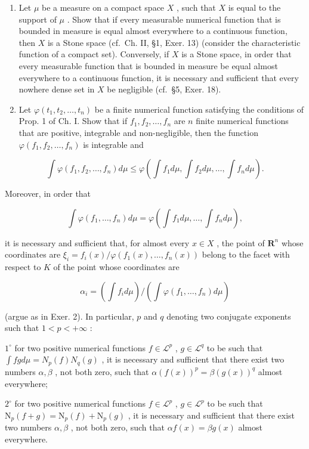 \begin{enumerate}
\def\labelenumi{\arabic{enumi})}
\setcounter{enumi}{2}
\item
  Let \(\mu\) be a measure on a compact space \(X\) , such that \(X\) is equal to the support of \(\mu\) . Show that if every measurable numerical function that is bounded in measure is equal almost everywhere to a continuous function, then \(X\) is a Stone space (cf.~Ch. II, §1, Exer. 13) (consider the characteristic function of a compact set). Conversely, if \(X\) is a Stone space, in order that every measurable function that is bounded in measure be equal almost everywhere to a continuous function, it is necessary and sufficient that every nowhere dense set in \(X\) be negligible (cf.~§5, Exer. 18).
\item
  Let \(\varphi(t_1, t_2, \ldots, t_n)\) be a finite numerical function satisfying the conditions of Prop. 1 of Ch. I. Show that if \(f_1, f_2, \ldots, f_n\) are \(n\) finite numerical functions that are positive, integrable and non-negligible, then the function \(\varphi(f_1, f_2, \ldots, f_n)\) is integrable and
\end{enumerate}

\[
\int \varphi (f _ {1}, f _ {2}, \dots , f _ {n}) d \mu \leqslant \varphi (\int f _ {1} d \mu , \int f _ {2} d \mu , \dots , \int f _ {n} d \mu).
\]

Moreover, in order that

\[
\int \varphi (f _ {1}, \dots , f _ {n}) d \mu = \varphi (\int f _ {1} d \mu , \dots , \int f _ {n} d \mu),
\]

it is necessary and sufficient that, for almost every \(x \in X\) , the point of \(\mathbf{R}^n\) whose coordinates are \(\xi_i = f_i(x) / \varphi(f_1(x), \ldots, f_n(x))\) belong to the facet with respect to \(K\) of the point whose coordinates are

\[
\alpha_ {i} = (\int f _ {i} d \mu) / (\int \varphi (f _ {1}, \dots , f _ {n}) d \mu)
\]

(argue as in Exer. 2). In particular, \(p\) and \(q\) denoting two conjugate exponents such that \(1 < p < +\infty\) :

\(1^{\circ}\) for two positive numerical functions \(f \in \mathcal{L}^{p}\) , \(g \in \mathcal{L}^{q}\) to be such that \(\int fg d\mu = N_{p}(f)N_{q}(g)\) , it is necessary and sufficient that there exist two numbers \(\alpha, \beta\) , not both zero, such that \(\alpha(f(x))^{p} = \beta(g(x))^{q}\) almost everywhere;

\(2^{\circ}\) for two positive numerical functions \(f \in \mathcal{L}^{p}\) , \(g \in \mathcal{L}^{p}\) to be such that \(\mathrm{N}_{p}(f + g) = \mathrm{N}_{p}(f) + \mathrm{N}_{p}(g)\) , it is necessary and sufficient that there exist two numbers \(\alpha, \beta\) , not both zero, such that \(\alpha f(x) = \beta g(x)\) almost everywhere.

